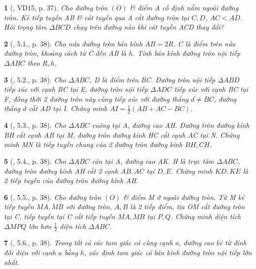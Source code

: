 \documentclass{article}
\newtheorem{baitoan}{}
\begin{document}
\begin{baitoan}[\cite{TLCT_THCS_Toan_9_hinh_hoc}, VD15, p. 37]
	Cho đường tròn $(O)$ \& điểm A cố định nằm ngoài đường tròn. Kẻ tiếp tuyến AB \& cát tuyến qua A cắt đường tròn tại $C,D$, $AC < AD$. Hỏi trọng tâm $\Delta BCD$ chạy trên đường nào khi cát tuyến ACD thay đổi?
\end{baitoan}

\begin{baitoan}[\cite{TLCT_THCS_Toan_9_hinh_hoc}, 5.1., p. 38]
	Cho nửa đường tròn bán kính $AB = 2R$. C là điểm trên nửa đường tròn, khoảng cách từ C đến AB là $h$. Tính bán kính đường tròn nội tiếp $\Delta ABC$ theo $R,h$.
\end{baitoan}

\begin{baitoan}[\cite{TLCT_THCS_Toan_9_hinh_hoc}, 5.2., p. 38]
	Cho $\Delta ABC$, D là điểm trên BC. Đường tròn nội tiếp $\Delta ABD$ tiếp xúc với cạnh BC tại E, đường tròn nội tiếp $\Delta ADC$ tiếp xúc với cạnh BC tại F, đồng thời 2 đường tròn này cùng tiếp xúc với đường thẳng $d\ne BC$, đường thẳng $d$ cắt AD tại I. Chứng minh $AI = \frac{1}{2}(AB + AC - BC)$.
\end{baitoan}

\begin{baitoan}[\cite{TLCT_THCS_Toan_9_hinh_hoc}, 5.3., p. 38]
	Cho $\Delta ABC$ vuông tại A, đường cao AH. Đường tròn đường kính BH cắt cạnh AB tại M, đường tròn đường kính HC cắt cạnh AC tại N. Chứng minh MN là tiếp tuyến chung của 2 đường tròn đường kính $BH,CH$.
\end{baitoan}

\begin{baitoan}[\cite{TLCT_THCS_Toan_9_hinh_hoc}, 5.4., p. 38]
	Cho $\Delta ABC$ cân tại A, đường cao AK. H là trực tâm $\Delta ABC$, đường tròn đường kính AH cắt 2 cạnh $AB,AC$ tại $D,E$. Chứng minh $KD,KE$ là 2 tiếp tuyến của đường tròn đường kính AH.
\end{baitoan}

\begin{baitoan}[\cite{TLCT_THCS_Toan_9_hinh_hoc}, 5.5., p. 38]
	Cho đường tròn $(O)$ \& điểm M ở ngoài đường tròn. Từ M kẻ tiếp tuyến $MA,MB$ với đường tròn, $A,B$ là 2 tiếp điểm, tia OM cắt đường tròn tại C, tiếp tuyến tại C cắt tiếp tuyến $MA,MB$ tại $P,Q$. Chứng minh diện tích $\Delta MPQ$ lớn hơn $\frac{1}{2}$ diện tích $\Delta ABC$.
\end{baitoan}

\begin{baitoan}[\cite{TLCT_THCS_Toan_9_hinh_hoc}, 5.6., p. 38]
	Trong tất cả các tam giác có cùng cạnh $a$, đường cao kẻ từ đỉnh đối diện với cạnh $a$ bằng $h$, xác định tam giác có bán kính đường tròn nội tiếp lớn nhất.
\end{baitoan}
\end{document}
